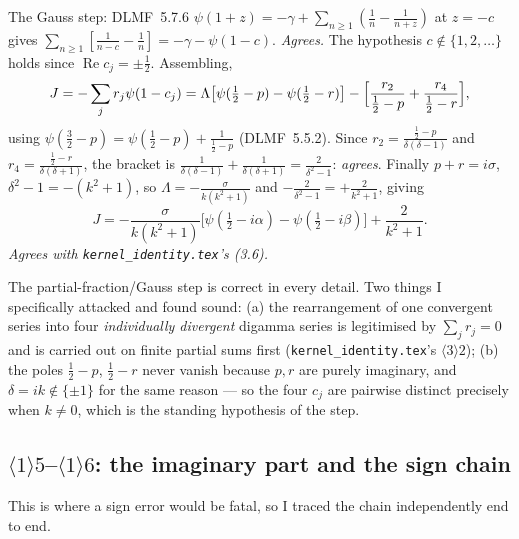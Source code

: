 \documentclass[11pt]{article}
\newcommand{\KI}{\texttt{kernel\_identity.tex}}\newcommand{\NOTE}{\texttt{universality\_normalization.tex}}
\begin{document}
The Gauss step: DLMF~5.7.6 \(\psi(1+z)=-\gamma+\sum_{n\ge1}(\frac1n-\frac1{n+z})\) at \(z=-c\) gives
\(\sum_{n\ge1}[\frac1{n-c}-\frac1n]=-\gamma-\psi(1-c)\).  \emph{Agrees.}  The hypothesis
\(c\notin\{1,2,\dots\}\) holds since \(\operatorname{Re}c_j=\pm\frac12\).  Assembling,
\[
 J=-\sum_jr_j\psi(1-c_j)
 =\Lambda\bigl[\psi(\tfrac12-p)-\psi(\tfrac12-r)\bigr]-\Bigl[\frac{r_2}{\frac12-p}
 +\frac{r_4}{\frac12-r}\Bigr],
\]
using \(\psi(\frac32-p)=\psi(\frac12-p)+\frac1{\frac12-p}\) (DLMF~5.5.2).  Since
\(r_2=\frac{\frac12-p}{\delta(\delta-1)}\) and \(r_4=\frac{\frac12-r}{\delta(\delta+1)}\), the
bracket is \(\frac1{\delta(\delta-1)}+\frac1{\delta(\delta+1)}=\frac{2}{\delta^2-1}\):
\emph{agrees}.  Finally \(p+r=i\sigma\), \(\delta^2-1=-(k^2+1)\), so
\(\Lambda=-\frac\sigma{k(k^2+1)}\) and \(-\frac2{\delta^2-1}=+\frac2{k^2+1}\), giving
\begin{equation}\label{eq:Jcl}
 J=-\frac{\sigma}{k(k^2+1)}\bigl[\psi(\tfrac12-i\alpha)-\psi(\tfrac12-i\beta)\bigr]+\frac2{k^2+1}.
\end{equation}
\emph{Agrees with \KI's (3.6).}

\begin{verdictok}
The partial-fraction/Gauss step is correct in every detail.  Two things I specifically attacked
and found sound: (a) the rearrangement of one convergent series into four \emph{individually
divergent} digamma series is legitimised by \(\sum_jr_j=0\) and is carried out on finite partial
sums first (\KI's \(\langle3\rangle2\)); (b) the poles \(\frac12-p\), \(\frac12-r\) never vanish
because \(p,r\) are purely imaginary, and \(\delta=ik\notin\{\pm1\}\) for the same reason --- so
the four \(c_j\) are pairwise distinct precisely when \(k\neq0\), which is the standing hypothesis
of the step.
\end{verdictok}

\subsection{\(\langle1\rangle5\)--\(\langle1\rangle6\): the imaginary part and the sign chain}

This is where a sign error would be fatal, so I traced the chain independently end to end.
\end{document}
